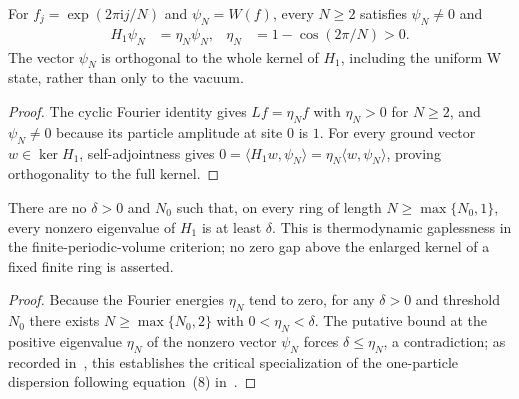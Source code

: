 \begin{lemma}
    \label{thm:pvbs_critical_fourier_magnon}
    \leanok
    For $f_j=\exp(2\pi\mathrm{i}j/N)$ and $\psi_N=W(f)$, every $N\ge2$
    satisfies $\psi_N\ne0$ and
    \begin{align}
        H_1\psi_N & =\eta_N\psi_N,
                  & \eta_N         & =1-\cos(2\pi/N)>0.
        \label{eq:pvbs_critical_fourier_energy}
    \end{align}
    The vector $\psi_N$ is orthogonal to the whole kernel of $H_1$,
    including the uniform W state, rather than only to the vacuum.
\end{lemma}
\begin{proof}
    \leanok
    The cyclic Fourier identity gives $Lf=\eta_N f$ with $\eta_N>0$ for
    $N\ge2$, and $\psi_N\ne0$ because its particle amplitude at site $0$ is
    $1$. For every ground vector $w\in\ker H_1$, self-adjointness gives
    $0=\langle H_1w,\psi_N\rangle=\eta_N\langle w,\psi_N\rangle$, proving
    orthogonality to the full kernel.
\end{proof}

\begin{lemma}
    \label{thm:pvbs_critical_gaplessness}
    \leanok
    There are no $\delta>0$ and $N_0$ such that, on every ring of length
    $N\ge\max\{N_0,1\}$, every nonzero eigenvalue of $H_1$ is at least
    $\delta$.
    This is thermodynamic gaplessness in the finite-periodic-volume
    criterion; no zero gap above the enlarged kernel of a fixed finite
    ring is asserted.
\end{lemma}
\begin{proof}
    \leanok
    Because the Fourier energies $\eta_N$ tend to zero, for any $\delta>0$ and
    threshold $N_0$ there exists $N\ge\max\{N_0,2\}$ with $0<\eta_N<\delta$.
    The putative bound at the positive eigenvalue $\eta_N$ of the nonzero
    vector $\psi_N$ forces $\delta\le\eta_N$, a contradiction; as recorded
    in~\cite{gap:bn12_pvbs_periodic_gap}, this establishes the critical
    specialization of the one-particle dispersion following equation~(8)
    in~\cite{BachmannNachtergaele2012PVBS}.
\end{proof}
